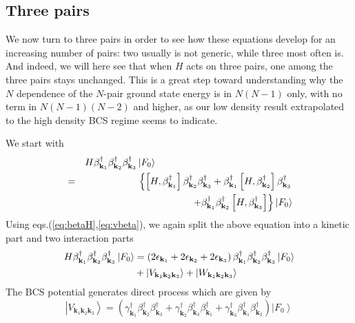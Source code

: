 \documentclass[aps,prb,superscriptaddress,showpacs,reprint,lengthcheck]{revtex4-1}
\begin{document}
\subsection{Three pairs}

We now turn to three pairs in order to see how these equations develop for an
increasing number of pairs: two usually is not generic, while three most often is.  And indeed, we will here see that when $H$ acts on three pairs, one among the three pairs stays unchanged.   This is a great step toward understanding why the $N$ dependence of the $N$-pair ground state energy is in $N(N-1)$ only, with no term in $N(N-1)(N-2)$ and higher, as our low density result extrapolated to the high density BCS regime seems to indicate.  


We start with 
\begin{eqnarray}  \label{eq:SchThree}
&&H\beta^{\dagger}_{\mathbf{k} _1}\beta^{\dagger}_{\mathbf{k}
_2}\beta^{\dagger}_{\mathbf{k} _3}\left|F_0\right>  \hspace{5cm}
\nonumber\\
&=&\left\{\left[H,\beta^{\dagger}_{\mathbf{k} _1}\right]  \beta^{\dagger}_{%
\mathbf{k} _2}\beta^{\dagger}_{\mathbf{k} _3}+\beta^{\dagger}_{\mathbf{k} _1}%
\left[H,\beta^{\dagger}_{\mathbf{k} _2}\right]  \beta^{\dagger}_{\mathbf{k}
_3}\right.
\nonumber\\ &&\left.
+\beta^{\dagger}_{\mathbf{k} _1}\beta^{\dagger}_{\mathbf{k} _2}\left[%
H,\beta^{\dagger}_{\mathbf{k} _3}\right]  \right\}
\left|F_0\right> 
\end{eqnarray}%
 Using eqs.(\ref{eq:betaH},\ref{eq:vbeta}), we again  split the above equation into a kinetic part and two interaction parts
\begin{equation}  \label{eq:SchThree2}
\begin{split}
H\beta^{\dagger}_{\mathbf{k} _1}\beta^{\dagger}_{\mathbf{k}
_2}\beta^{\dagger}_{\mathbf{k} _3}\left|F_0\right>   &=\left(2\epsilon_{%
\mathbf{k} _1}+2\epsilon_{\mathbf{k} _2}+2\epsilon_{\mathbf{k} _3}\right)
\beta^{\dagger}_{\mathbf{k} _1}\beta^{\dagger}_{\mathbf{k}
_2}\beta^{\dagger}_{\mathbf{k} _3}\left|F_0\right>   \\
&+\left|{V}_{\mathbf{k} _1\mathbf{k} _2\mathbf{k} _3}\right> +\left|{W}_{\mathbf{k} _1\mathbf{k} _2\mathbf{k} _3}\right> 
\end{split}%
\end{equation}
The  BCS potential generates direct process which are given by 
\begin{equation}  \label{eq:vThree}
\left|V_{\mathbf{k} _1\mathbf{k} _2\mathbf{k} _3}\right> =
\left(\gamma^{\dagger}_{\mathbf{k} _1}\beta^{\dagger}_{\mathbf{k}
_2}\beta^{\dagger}_{\mathbf{k} _3}+\gamma^{\dagger}_{\mathbf{k}
_2}\beta^{\dagger}_{\mathbf{k} _3}\beta^{\dagger}_{\mathbf{k}
_1}+\gamma^{\dagger}_{\mathbf{k} _3}\beta^{\dagger}_{\mathbf{k}
_1}\beta^{\dagger}_{\mathbf{k} _2}\right) \left|F_0\right>   
\end{equation}
\end{document}

